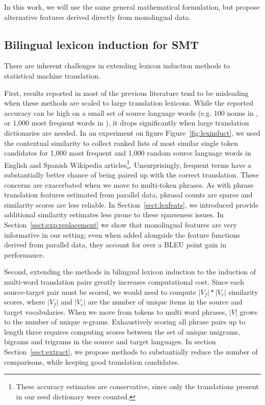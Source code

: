 \documentclass[11pt]{article}
\newcommand{\secref}[1]{Section~\ref{#1}}
\newcommand{\figref}[1]{Figure~\ref{#1}}
\begin{document}
In this work, we will use the same general mathematical formulation, but propose alternative features derived directly from monolingual data.

 \subsection{Bilingual lexicon induction for SMT} \label{sect:bckg:lexind}
 
There are inherent challenges in extending lexicon induction methods to statistical machine translation.  

First, results reported in most of the previous literature tend to be misleading when these methods are scaled to large translation lexicons.  While the reported accuracy can be high on a small set of source language words (e.g. 100 nouns in \cite{Rapp:1995}, or 1,000 most frequent words in \cite{Koehn:2002}), it drops significantly when large translation dictionaries are needed.  In an experiment on figure \figref{fig:lexinduct}, we used the contextual similarity to collect ranked lists of most similar single token candidates for 1,000 most frequent and 1,000 random source language words in English and Spanish Wikipedia articles\footnote{These accuracy estimates are conservative, since only the translations present in our seed dictionary were counted.}.  Unsurprisingly, frequent terms have a substantially better chance of being paired up with the correct translation.  These concerns are exacerbated when we move to multi-token phrases.  As with phrase translation features estimated from parallel data, phrasal counts are sparse and similarity scores are less reliable.   In \secref{sect:lexfeats}, we introduced provide additional similarity estimates less prone to these sparseness issues.  In \secref{sect:exp:replacement} we show that monolingual features are very informative in our setting; even when added alongside the feature functions derived from parallel data, they account for over a BLEU point gain in performance.

Second, extending the methods in bilingual lexicon induction to the induction of multi-word translation pairs greatly increases computational cost. Since each source-target pair must be scored, we would need to compute $|V_{f}| * |V_{e}|$ similarity scores, where $|V_{f}|$ and $|V_{e}|$ are the number of unique items in the source and target vocabularies. When we move from tokens to multi word phrases, $|V|$ grows to the number of unique {\it n}-grams. Exhaustively scoring all phrase pairs up to length three requires computing scores between the set of unique unigrams, bigrams and trigrams in the source and target languages.  In section \secref{sect:extract}, we propose methods to substantially reduce the number of comparisons, while keeping good translation candidates.
 
\end{document}
